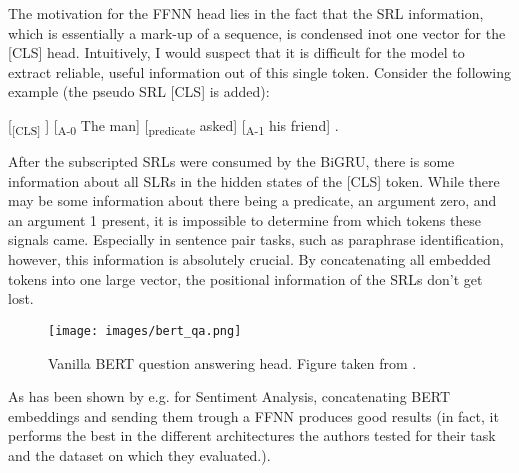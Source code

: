 
The motivation for the FFNN head lies in the fact that the SRL information, which is essentially
a mark-up of a sequence, is condensed inot one vector for the [CLS] head. Intuitively, I would
suspect that it is difficult for the model to extract reliable, useful information out of this
single token. Consider the following example (the pseudo SRL [CLS] is added):


[\textsubscript{[CLS]} ] [\textsubscript{A-0} The man] [\textsubscript{predicate} asked] [\textsubscript{A-1} his friend] .

After the subscripted SRLs were consumed by the BiGRU, there is some information about all SLRs
in the hidden states of the [CLS] token. While there may be some information about there being a
predicate, an argument zero, and an argument 1 present, it is impossible to determine from which
tokens these signals came. Especially in sentence pair tasks, such as paraphrase identification,
however, this information is absolutely crucial. By concatenating all embedded tokens into one
large vector, the positional information of the SRLs don't get lost.

\begin{wrapfigure}[17]{r}{0.45\linewidth}
  \begin{center}
    \texttt{[image: images/bert\_qa.png]}
  \end{center}
  \caption[BERT Q\&A]{Vanilla BERT question answering head. Figure taken from \citep{devlin2018bert}.}
  \label{fig:bert-qa}
\end{wrapfigure}

As has been shown by e.g. \cite{myagmar2019transferable} for Sentiment Analysis, concatenating
BERT embeddings and sending them trough a FFNN produces good results (in fact, it performs the
best in the different architectures the authors tested for their task and the dataset on which
they evaluated.).


